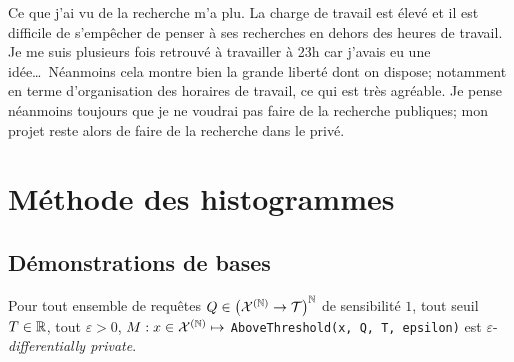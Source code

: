 Ce que j'ai vu de la recherche m'a plu. La charge de travail est élevé et il est difficile de s’empêcher de penser à ses recherches en dehors des heures de travail. Je me suis plusieurs fois retrouvé à travailler à 23h car j'avais eu une idée\dots\ Néanmoins cela montre bien la grande liberté dont on dispose; notamment en terme d'organisation des horaires de travail, ce qui est très agréable. Je pense néanmoins toujours que je ne voudrai pas faire de la recherche publiques; mon projet reste alors de faire de la recherche dans le privé.

\section{Méthode des histogrammes}

\subsection{Démonstrations de bases}

\begin{theorem}
    \label{dem1}
    Pour tout ensemble de requêtes \(Q \in \left( \mathcal X^{(\mathbb{N})} \to  \mathcal T \right)^{\mathbb{N}}\) de sensibilité \(1\), tout seuil \(T \in \mathbb{R}\), tout \(\varepsilon > 0\), \(M : x \in \mathcal X^{(\mathbb{N})} \mapsto \) \texttt{AboveThreshold(x, Q, T, epsilon)} est \(\varepsilon\)-\textit{differentially private}.
\end{theorem}



